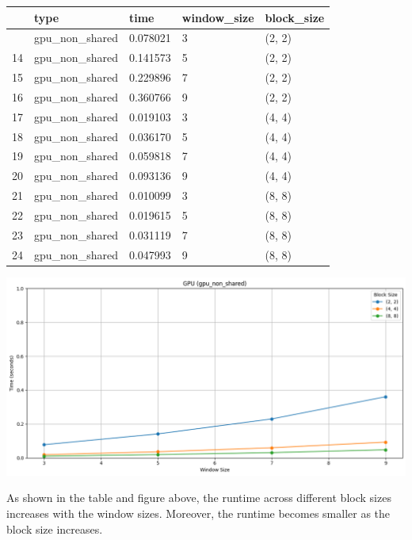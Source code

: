 \documentclass[
  10pt,
  a4paper,
  a4paper]{article}
\begin{document}
\begin{longtable}[]{@{}lllll@{}}
\toprule\noalign{}
& type & time & window\_size & block\_size \\
\midrule\noalign{}
\endhead
\bottomrule\noalign{}
\endlastfoot
13 & gpu\_non\_shared & 0.078021 & 3 & (2, 2) \\
14 & gpu\_non\_shared & 0.141573 & 5 & (2, 2) \\
15 & gpu\_non\_shared & 0.229896 & 7 & (2, 2) \\
16 & gpu\_non\_shared & 0.360766 & 9 & (2, 2) \\
17 & gpu\_non\_shared & 0.019103 & 3 & (4, 4) \\
18 & gpu\_non\_shared & 0.036170 & 5 & (4, 4) \\
19 & gpu\_non\_shared & 0.059818 & 7 & (4, 4) \\
20 & gpu\_non\_shared & 0.093136 & 9 & (4, 4) \\
21 & gpu\_non\_shared & 0.010099 & 3 & (8, 8) \\
22 & gpu\_non\_shared & 0.019615 & 5 & (8, 8) \\
23 & gpu\_non\_shared & 0.031119 & 7 & (8, 8) \\
24 & gpu\_non\_shared & 0.047993 & 9 & (8, 8) \\
\end{longtable}

\includegraphics{Report.10.kuwahara_files/figure-pdf/cell-7-output-1.png}

As shown in the table and figure above, the runtime across different
block sizes increases with the window sizes. Moreover, the runtime
becomes smaller as the block size increases.
\end{document}

